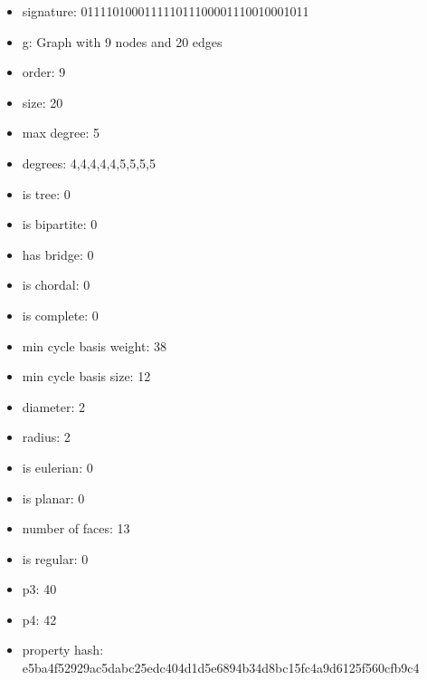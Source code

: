 \newpage
\begin{figure}
\end{figure}
\begin{itemize}
\item signature: 011110100011111011100001110010001011
\item g: Graph with 9 nodes and 20 edges
\item order: 9
\item size: 20
\item max degree: 5
\item degrees: 4,4,4,4,4,5,5,5,5
\item is tree: 0
\item is bipartite: 0
\item has bridge: 0
\item is chordal: 0
\item is complete: 0
\item min cycle basis weight: 38
\item min cycle basis size: 12
\item diameter: 2
\item radius: 2
\item is eulerian: 0
\item is planar: 0
\item number of faces: 13
\item is regular: 0
\item p3: 40
\item p4: 42
\item property hash: e5ba4f52929ac5dabc25edc404d1d5e6894b34d8bc15fc4a9d6125f560cfb9c4
\end{itemize}
